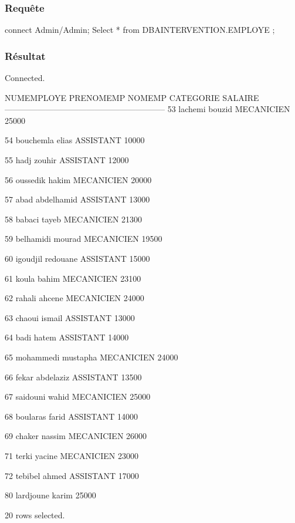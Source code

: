\documentclass[•]{article}
\begin{document}
\subsubsection{Requête}
\begin{sql}
connect Admin/Admin;
	Select * from DBAINTERVENTION.EMPLOYE ;
\end{sql}
\subsubsection{Résultat}
\begin{sql}
Connected.

NUMEMPLOYE  PRENOMEMP        NOMEMP    CATEGORIE    SALAIRE
-----------------------------------------------------------
        53    lachemi        bouzid   MECANICIEN      25000

        54  bouchemla         elias    ASSISTANT      10000

        55       hadj        zouhir    ASSISTANT      12000

        56   oussedik         hakim   MECANICIEN      20000

        57       abad    abdelhamid    ASSISTANT      13000

        58     babaci         tayeb   MECANICIEN      21300

        59  belhamidi        mourad   MECANICIEN      19500

        60   igoudjil      redouane    ASSISTANT      15000

        61      koula         bahim   MECANICIEN      23100

        62     rahali        ahcene   MECANICIEN      24000

        63     chaoui        ismail    ASSISTANT      13000

        64       badi         hatem    ASSISTANT      14000

        65  mohammedi      mustapha   MECANICIEN      24000

        66      fekar     abdelaziz    ASSISTANT      13500

        67   saidouni         wahid   MECANICIEN      25000

        68   boularas         farid    ASSISTANT      14000

        69     chaker        nassim   MECANICIEN      26000

        71      terki        yacine   MECANICIEN      23000

        72    tebibel         ahmed    ASSISTANT      17000

        80  lardjoune         karim                   25000


20 rows selected.
\end{sql}
\end{document}
